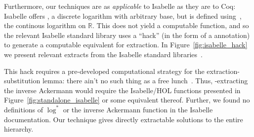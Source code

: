 Furthermore, our techniques are as \emph{applicable} to Isabelle as they are to Coq:
Isabelle offers , a discrete logarithm with arbitrary base, but 
 is defined using~, the continous logarithm on $\mathbb{R}$.
This does not yield a computable function, and so the relevant 
Isabelle standard library
uses a ``hack'' (in the form of a \li{[code]} annotation) to generate a computable equivalent for extraction.
In Figure~\ref{fig:isabelle_hack} we present relevant extracts from the Isabelle standard libraries~\cite{isastan2013, isastan2019}.

This hack requires a pre-developed computational strategy 
for the \li{[code]} extraction-substitution lemma: there ain't no such thing 
as a free lunch~\cite{moonmistress}. Thus, \li{[code]}-extracting the inverse 
Ackermann would require the Isabelle/HOL functions presented in Figure~\ref{fig:standalone_isabelle} or some equivalent thereof. 
Further, we found no definitions of $\log^*$ 
or the inverse Ackermann function in the Isabelle documentation. Our technique 
gives directly extractable solutions to the entire hierarchy.
\lstset{style=myStyle}

